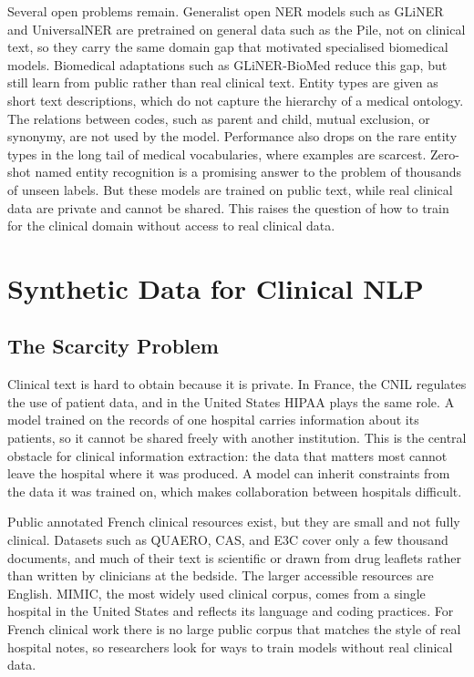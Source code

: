 Several open problems remain. Generalist open NER models such as GLiNER and UniversalNER are
pretrained on general data such as the Pile, not on clinical text, so they carry the same
domain gap that motivated specialised biomedical models. Biomedical adaptations such as
GLiNER-BioMed reduce this gap, but still learn from public rather than real clinical text. Entity types are given as short text descriptions, which do not capture the
hierarchy of a medical ontology. The relations between codes, such as parent and child, mutual
exclusion, or synonymy, are not used by the model. Performance also drops on the rare entity
types in the long tail of medical vocabularies, where examples are scarcest. Zero-shot
named entity recognition is a promising answer to the problem of thousands of unseen labels.
But these models are trained on public text, while real clinical data are private and
cannot be shared. This raises the question of how to train for the clinical domain without
access to real clinical data.
\section{Synthetic Data for Clinical NLP}
\label{sec:ie-synthetic}

\subsection{The Scarcity Problem}

Clinical text is hard to obtain because it is private. In France, the CNIL regulates the use of
patient data, and in the United States HIPAA plays the same role. A model trained on the
records of one hospital carries information about its patients, so it cannot be shared freely
with another institution. This is the central obstacle for clinical information extraction:
the data that matters most cannot leave the hospital where it was produced. A model can inherit
constraints from the data it was trained on, which makes collaboration between hospitals
difficult.

Public annotated French clinical resources exist, but they are small and not fully clinical.
Datasets such as QUAERO, CAS, and E3C cover only a few thousand documents, and much of their
text is scientific or drawn from drug leaflets rather than written by clinicians at the
bedside. The larger accessible resources are English. MIMIC, the most widely used clinical
corpus, comes from a single hospital in the United States and reflects its language and coding
practices. For French clinical work there is no large public corpus that matches the style of
real hospital notes, so researchers look for ways to train models without real clinical data.

